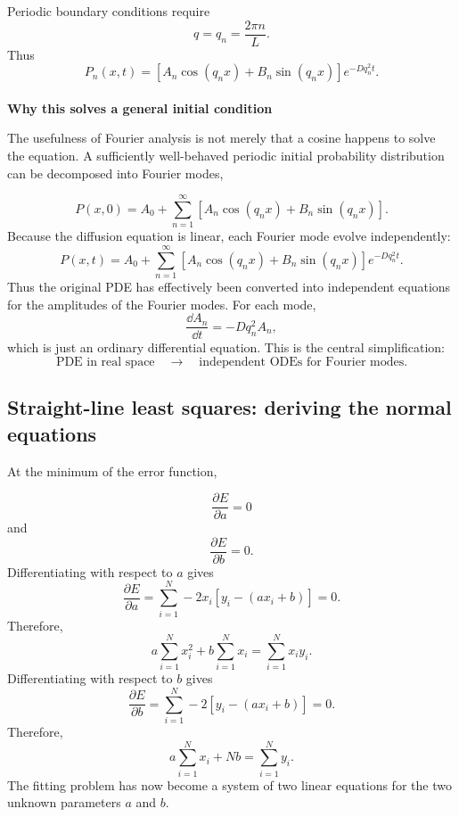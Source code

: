 Periodic boundary conditions require
% 
\[
    q = q_n = \frac{2\pi n}{L}.
\]
% 
Thus
% 
\[
    \boxed{ P_n(x,t) = \left[ A_n\cos(q_nx) + B_n\sin(q_nx) \right] e^{-Dq_n^2t}. }
\]
% 
% 
\medskip
\\
\textbf{Why this solves a general initial condition}

The usefulness of Fourier analysis is not merely that a cosine happens to solve the equation.
A sufficiently well-behaved periodic initial probability distribution can be decomposed into Fourier modes,

\[
    P(x,0) = A_0 + \sum_{n=1}^{\infty} \left[ A_n\cos(q_nx) + B_n\sin(q_nx) \right].
\]
% 
Because the diffusion equation is linear, each Fourier mode evolve independently:
% 
\[
    P(x,t) = A_0 + \sum_{n=1}^{\infty} \left[ A_n\cos(q_nx) + B_n\sin(q_nx) \right] e^{-Dq_n^2t}.
\]
% 
Thus the original PDE has effectively been converted into independent equations for the amplitudes of the Fourier modes.
% 
For each mode,
% 
\[
    \frac{\dd A_n}{\dd t} = -Dq_n^2A_n,
\]
% 
which is just an ordinary differential equation.
% 
This is the central simplification:
% 
\[
    \boxed{ \text{PDE in real space} \quad\longrightarrow\quad \text{independent ODEs for Fourier modes}. }
\]



\subsection{Straight-line least squares: deriving the normal equations}
\label{deriv:fit}


At the minimum of the error function,

\[
    \frac{\partial E}{\partial a}=0
\]
% 
and
% 
\[
    \frac{\partial E}{\partial b}=0.
\]
% 
Differentiating with respect to $a$ gives
% 
\[
    \frac{\partial E}{\partial a}=\sum_{i=1}^{N}-2x_i\left[y_i-(ax_i+b)\right]=0.
\]
% 
Therefore,
% 
\[
    a\sum_{i=1}^{N}x_i^2+b\sum_{i=1}^{N}x_i=\sum_{i=1}^{N}x_iy_i.
\]
% 
Differentiating with respect to $b$ gives
% 
\[
    \frac{\partial E}{\partial b}=\sum_{i=1}^{N}-2\left[y_i-(ax_i+b)\right]=0.
\]
% 
Therefore,
% 
\[
    a\sum_{i=1}^{N}x_i+Nb=\sum_{i=1}^{N}y_i.
\]
% 
The fitting problem has now become a system of two linear equations for the two unknown parameters $a$ and $b$.



